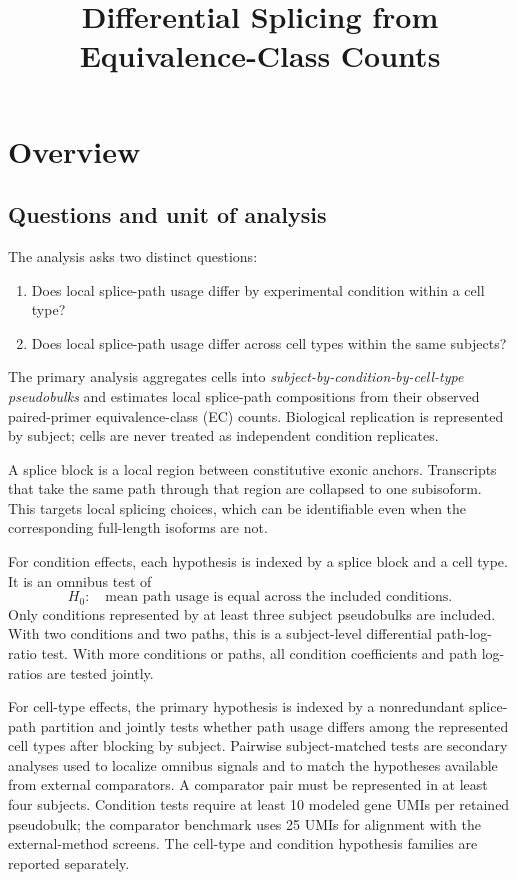 \documentclass[11pt]{article}
\title{Differential Splicing from Equivalence-Class Counts}
\author{}
\date{}
\begin{document}
\maketitle

\section*{Overview}

\subsection*{Questions and unit of analysis}

The analysis asks two distinct questions:
\begin{enumerate}[leftmargin=*]
  \item Does local splice-path usage differ by experimental condition within a cell type?
  \item Does local splice-path usage differ across cell types within the same subjects?
\end{enumerate}
The primary analysis aggregates cells into \emph{subject-by-condition-by-cell-type pseudobulks} and estimates local splice-path compositions from their observed paired-primer equivalence-class (EC) counts. Biological replication is represented by subject; cells are never treated as independent condition replicates.

A splice block is a local region between constitutive exonic anchors. Transcripts that take the same path through that region are collapsed to one subisoform. This targets local splicing choices, which can be identifiable even when the corresponding full-length isoforms are not.

For condition effects, each hypothesis is indexed by a splice block and a cell type. It is an omnibus test of \[
  H_0:\quad\text{mean path usage is equal across the included conditions}.
\]
Only conditions represented by at least three subject pseudobulks are included. With two conditions and two paths, this is a subject-level differential path-log-ratio test. With more conditions or paths, all condition coefficients and path log-ratios are tested jointly.

For cell-type effects, the primary hypothesis is indexed by a nonredundant splice-path partition and jointly tests whether path usage differs among the represented cell types after blocking by subject. Pairwise subject-matched tests are secondary analyses used to localize omnibus signals and to match the hypotheses available from external comparators. A comparator pair must be represented in at least four subjects. Condition tests require at least 10 modeled gene UMIs per retained pseudobulk; the comparator benchmark uses 25 UMIs for alignment with the external-method screens. The cell-type and condition hypothesis families are reported separately.
\end{document}
